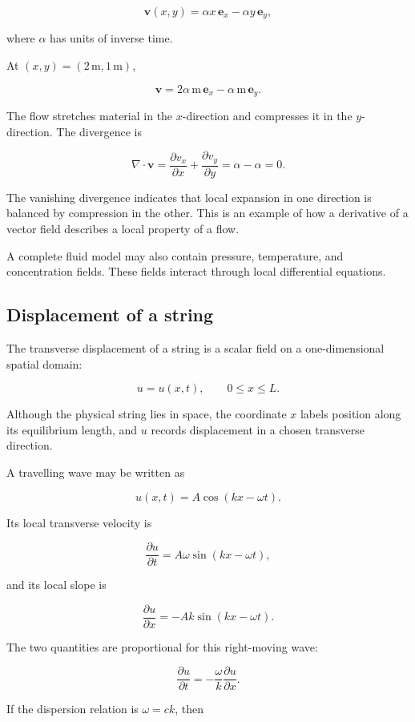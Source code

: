 \[
\mathbf{v}(x,y)
=
\alpha x\,\mathbf{e}_{x}
-
\alpha y\,\mathbf{e}_{y},
\]

where \(\alpha\) has units of inverse time.

At \((x,y)=(2\,\mathrm{m},1\,\mathrm{m})\),

\[
\mathbf{v}
=
2\alpha\,\mathrm{m}\,\mathbf{e}_{x}
-
\alpha\,\mathrm{m}\,\mathbf{e}_{y}.
\]

The flow stretches material in the \(x\)-direction and compresses it in the \(y\)-direction. The divergence is

\[
\nabla\cdot\mathbf{v}
=
\frac{\partial v_{x}}{\partial x}
+
\frac{\partial v_{y}}{\partial y}
=
\alpha-\alpha
=
0.
\]

The vanishing divergence indicates that local expansion in one direction is balanced by compression in the other. This is an example of how a derivative of a vector field describes a local property of a flow.

A complete fluid model may also contain pressure, temperature, and concentration fields. These fields interact through local differential equations.

\subsection{Displacement of a string}

The transverse displacement of a string is a scalar field on a one-dimensional spatial domain:

\[
u=u(x,t),
\qquad 0\leq x\leq L.
\]

Although the physical string lies in space, the coordinate \(x\) labels position along its equilibrium length, and \(u\) records displacement in a chosen transverse direction.

A travelling wave may be written as

\[
u(x,t)
=
A\cos(kx-\omega t).
\]

Its local transverse velocity is

\[
\frac{\partial u}{\partial t}
=
A\omega\sin(kx-\omega t),
\]

and its local slope is

\[
\frac{\partial u}{\partial x}
=
-Ak\sin(kx-\omega t).
\]

The two quantities are proportional for this right-moving wave:

\[
\frac{\partial u}{\partial t}
=
-\frac{\omega}{k}
\frac{\partial u}{\partial x}.
\]

If the dispersion relation is \(\omega=ck\), then

